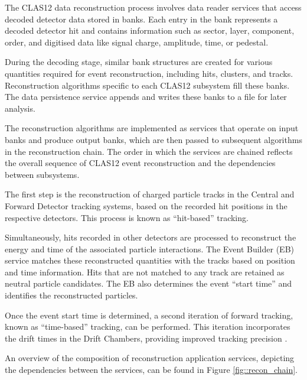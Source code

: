     The CLAS12 data reconstruction process involves data reader services that access decoded detector data stored in banks.
    Each entry in the bank represents a decoded detector hit and contains information such as sector, layer, component, order, and digitised data like signal charge, amplitude, time, or pedestal.

    During the decoding stage, similar bank structures are created for various quantities required for event reconstruction, including hits, clusters, and tracks.
    Reconstruction algorithms specific to each CLAS12 subsystem fill these banks.
    The data persistence service appends and writes these banks to a file for later analysis.

    The reconstruction algorithms are implemented as services that operate on input banks and produce output banks, which are then passed to subsequent algorithms in the reconstruction chain.
    The order in which the services are chained reflects the overall sequence of CLAS12 event reconstruction and the dependencies between subsystems.

    The first step is the reconstruction of charged particle tracks in the Central and Forward Detector tracking systems, based on the recorded hit positions in the respective detectors.
    This process is known as ``hit-based'' tracking.

    Simultaneously, hits recorded in other detectors are processed to reconstruct the energy and time of the associated particle interactions.
    The Event Builder (EB) service matches these reconstructed quantities with the tracks based on position and time information.
    Hits that are not matched to any track are retained as neutral particle candidates.
    The EB also determines the event ``start time'' and identifies the reconstructed particles.

    Once the event start time is determined, a second iteration of forward tracking, known as ``time-based'' tracking, can be performed.
    This iteration incorporates the drift times in the Drift Chambers, providing improved tracking precision \cite{ziegler2020}.

    An overview of the composition of reconstruction application services, depicting the dependencies between the services, can be found in Figure \ref{fig::recon_chain}.

    
    
